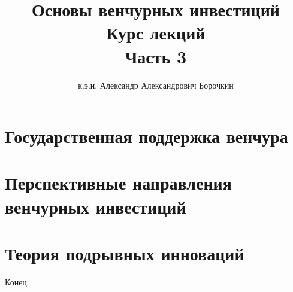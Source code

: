 \documentclass[12pt]{beamer}
\title[Основы венчурных инвестиций]{Основы венчурных инвестиций\\Курс лекций\\Часть 3}
\author{к.э.н. Александр Александрович Борочкин}
\institute{Нижегородский государственный университет}
\date{\the\year}
\begin{document}
\begin{frame}
\titlepage
\end{frame}


\section{Государственная поддержка венчура}


\section{Перспективные направления венчурных инвестиций}


\section{Теория подрывных инноваций}



\begin{frame}
\begin{center}
\huge{Конец}
\end{center}
\end{frame}
\end{document}
